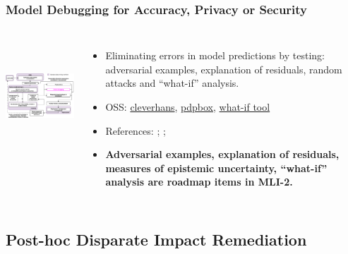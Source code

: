 \documentclass[11pt,
               aspectratio=169,
               hyperref={colorlinks}
               ]{beamer}
\begin{document}
			\begin{frame}
		
				\frametitle{Model Debugging for Accuracy, Privacy or Security}		
			
				\begin{columns}
	
					\centering
					\includegraphics[height=120pt]{img/md.png}
				
					\vspace{-5pt}
					\scriptsize
					{\begin{itemize}
						\item Eliminating errors in model predictions by testing: adversarial examples, explanation of residuals, random attacks and ``what-if'' analysis.
						\item OSS: \href{https://github.com/tensorflow/cleverhans}{cleverhans}, \href{https://github.com/SauceCat/PDPbox}{pdpbox}, \href{https://pair-code.github.io/what-if-tool/index.html}{what-if tool}
						\item References: ; ; 
						\item \textbf{Adversarial examples, explanation of residuals, measures of epistemic uncertainty, ``what-if'' analysis are roadmap items in MLI-2.}
					\end{itemize}}
					\normalsize
				
				\end{columns}			
			
			\end{frame}
				
		\subsection{Post-hoc Disparate Impact Remediation}
		
\end{document}
